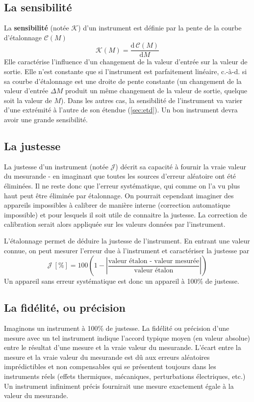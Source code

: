 \subsection{La sensibilité}

La \textbf{sensibilité} (notée $\mathcal{K}$) d'un instrument est définie par la pente de la courbe d'étalonnage $\mathcal{C}(M)$
$$
    \mathcal{K}(M)=\frac{\text{d}\,\mathcal{C}(M)}{\text{d}M}
$$
Elle caractérise l'influence d'un changement de la valeur d'entrée sur la valeur de sortie. Elle n'est constante que si l'instrument est parfaitement linéaire, c.-à-d. si sa courbe d'étalonnage est une droite de pente constante (un changement de la valeur d'entrée $\Delta M$ produit un même changement de la valeur de sortie, quelque soit la valeur de $M$). Dans les autres cas, la sensibilité de l'instrument va varier d'une extrémité à l'autre de son étendue (\ref{sec:etd}). Un bon instrument devra avoir une grande sensibilité.

\subsection{La justesse}

La justesse d'un instrument (notée $\mathcal{J}$) décrit sa capacité à fournir la vraie valeur du mesurande - en imaginant que toutes les sources d'erreur aléatoire ont été éliminées. Il ne reste donc que l'erreur systématique, qui comme on l'a vu plus haut peut être éliminée par étalonnage. On pourrait cependant imaginer des appareils impossibles à calibrer de manière interne (correction automatique impossible) et pour lesquels il soit utile de connaitre la justesse. La correction de calibration serait alors appliquée sur les valeurs données par l'instrument.

L'étalonnage permet de déduire la justesse de l'instrument. En entrant une valeur connue, on peut mesurer l'erreur due à l'instrument et caractériser la justesse par
$$
    \mathcal{J}\ [\%]=100\left(1-\left|\frac{\text{valeur étalon - valeur mesurée}}{\text{valeur étalon}}\right|\right)
$$
Un appareil sans erreur systématique est donc un appareil à 100\% de justesse.

\subsection{La fidélité, ou précision}

Imaginons un instrument à 100\% de justesse. La fidélité ou précision d'une mesure avec un tel instrument indique l'accord typique moyen (en valeur absolue) entre le résultat d'une mesure et la vraie valeur du mesurande. L'écart entre la mesure et la vraie valeur du mesurande est dû aux erreurs aléatoires imprédictibles et non compensables qui se présentent toujours dans les instruments réels (effets thermiques, mécaniques, perturbations électriques, etc.) Un instrument infiniment précis fournirait une mesure exactement égale à la valeur du mesurande.

